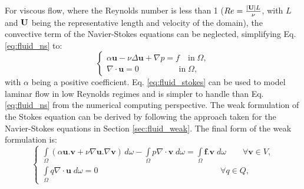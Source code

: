 For viscous flow, where the Reynolds number is less than 1 ($Re = {|{\bf U}|L \over \nu}$, with $L$ and $\bf U$ being the representative length and velocity of the domain), the convective term of the Navier-Stokes equations can be neglected, simplifying Eq. \ref{eq:fluid_ns} to:
\begin{equation} \label{eq:fluid_stokes}
\left\{ {\begin{array}{*{20}{l}}
\displaystyle  {\alpha \mathbf{u} - \nu\Delta \mathbf{u} + \nabla p = f\quad \text{in}\;\Omega ,} \\ 
\displaystyle  {\nabla\cdot\mathbf{u} = 0\quad \quad \quad \quad \;\;\;\text{in}\;\Omega ,}
\end{array}} \right.
\end{equation}
with $\alpha$ being a positive coefficient. Eq. \ref{eq:fluid_stokes} can be used to model laminar flow in low Reynolds regimes and is simpler to handle than Eq. \ref{eq:fluid_ns} from the numerical computing perspective. The weak formulation of the Stokes equation can be derived by following the approach taken for the Navier-Stokes equations in Section \ref{sec:fluid_weak}. The final form of the weak formulation is:
\begin{equation} \label{eq:fluid_stokes_weak}
\left\{ {\begin{array}{*{20}{l}}
\displaystyle  {\int\limits_\Omega  {(\alpha {\mathbf{u}}.{\mathbf{v}} + \nu\nabla {\mathbf{u}}.\nabla {\mathbf{v}})\,} d\omega  - \int\limits_\Omega  {p\nabla\cdot{\mathbf{v}}\;d\omega  = } \int\limits_\Omega  {{\mathbf{f}}.{\mathbf{v}}\;d\omega \qquad {\forall {\mathbf{v}}} \in V,} } \\ 
\displaystyle  {\int\limits_\Omega  {q\nabla\cdot{\mathbf{u}}\;d\omega  = 0} \qquad \qquad \qquad \qquad \qquad \qquad \qquad \;\;\;{\forall {{q}}} \in Q,} 
\end{array}} \right.
\end{equation}

